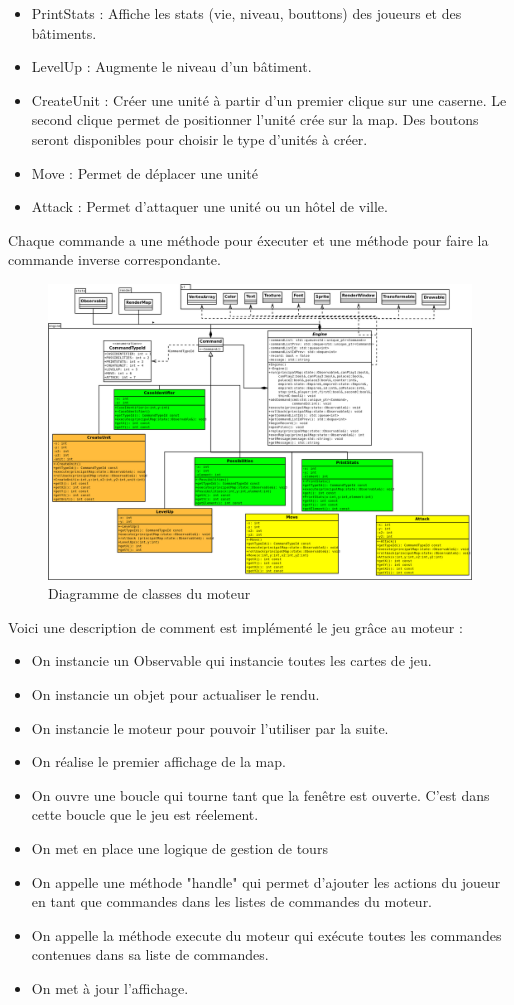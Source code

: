 \documentclass[12pt,a4paper]{article}
\begin{document}
\begin{itemize}
\begin{itemize}
        \item PrintStats : Affiche les stats (vie, niveau, bouttons) des joueurs et des bâtiments.
        \item LevelUp : Augmente le niveau d'un bâtiment.
        \item CreateUnit : Créer une unité à partir d'un premier clique sur une caserne. Le second clique permet de positionner l'unité crée sur la map. Des boutons seront disponibles pour choisir le type d'unités à créer.
        \item Move : Permet de déplacer une unité
        \item Attack : Permet d'attaquer une unité ou un hôtel de ville.
    \end{itemize}
\end{itemize}
Chaque commande a une méthode pour éxecuter et une méthode pour faire la commande inverse correspondante.
\begin{figure}[!ht]
\centering
    \includegraphics[width=1\textwidth]{ressources/engine.png}
     \caption{Diagramme de classes du moteur}
\end{figure}
\newpage
Voici une description de comment est implémenté le jeu grâce au moteur : \begin{itemize}
    \item On instancie un Observable qui instancie toutes les cartes de jeu.
    \item On instancie un objet pour actualiser le rendu. 
    \item On instancie le moteur pour pouvoir l'utiliser par la suite.
    \item On réalise le premier affichage de la map. 
    \item On ouvre une boucle qui tourne tant que la fenêtre est ouverte. C'est dans cette boucle que le jeu est réelement. 
    \item On met en place une logique de gestion de tours
    \item On appelle une méthode "handle" qui permet d'ajouter les actions du joueur en tant que commandes dans les listes de commandes du moteur. 
    \item On appelle la méthode execute du moteur qui exécute toutes les commandes contenues dans sa liste de commandes.
    \item On met à jour l'affichage. 
\end{itemize}
\newpage
\end{document}
